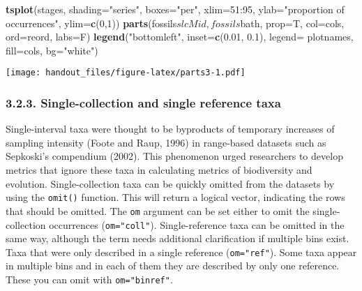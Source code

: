 \documentclass[]{article}
\newenvironment{Shaded}{\begin{snugshade}}{\end{snugshade}}
\newcommand{\KeywordTok}[1]{\textcolor[rgb]{0.13,0.29,0.53}{\textbf{{#1}}}}
\newcommand{\DataTypeTok}[1]{\textcolor[rgb]{0.13,0.29,0.53}{{#1}}}
\newcommand{\DecValTok}[1]{\textcolor[rgb]{0.00,0.00,0.81}{{#1}}}
\newcommand{\FloatTok}[1]{\textcolor[rgb]{0.00,0.00,0.81}{{#1}}}
\newcommand{\StringTok}[1]{\textcolor[rgb]{0.31,0.60,0.02}{{#1}}}
\newcommand{\NormalTok}[1]{{#1}}
\begin{document}
\begin{Shaded}
\begin{Highlighting}[]
\KeywordTok{tsplot}\NormalTok{(stages, }\DataTypeTok{shading=}\StringTok{"series"}\NormalTok{, }\DataTypeTok{boxes=}\StringTok{"per"}\NormalTok{, }\DataTypeTok{xlim=}\DecValTok{51}\NormalTok{:}\DecValTok{95}\NormalTok{,}
    \DataTypeTok{ylab=}\StringTok{"proportion of occurrences"}\NormalTok{, }\DataTypeTok{ylim=}\KeywordTok{c}\NormalTok{(}\DecValTok{0}\NormalTok{,}\DecValTok{1}\NormalTok{))}
\KeywordTok{parts}\NormalTok{(fossils$slcMid, fossils$bath, }\DataTypeTok{prop=}\NormalTok{T, }\DataTypeTok{col=}\NormalTok{cols, }\DataTypeTok{ord=}\NormalTok{reord, }\DataTypeTok{labs=}\NormalTok{F)}
\KeywordTok{legend}\NormalTok{(}\StringTok{"bottomleft"}\NormalTok{, }\DataTypeTok{inset=}\KeywordTok{c}\NormalTok{(}\FloatTok{0.01}\NormalTok{, }\FloatTok{0.1}\NormalTok{), }
  \DataTypeTok{legend=} \NormalTok{plotnames, }\DataTypeTok{fill=}\NormalTok{cols, }\DataTypeTok{bg=}\StringTok{"white"}\NormalTok{)}
\end{Highlighting}
\end{Shaded}

\texttt{[image: handout\_files/figure-latex/parts3-1.pdf]}

\subsubsection{3.2.3. Single-collection and single reference
taxa}\label{single-collection-and-single-reference-taxa}

Single-interval taxa were thought to be byproducts of temporary
increases of sampling intensity (Foote and Raup, 1996) in range-based
datasets such as Sepkoski's compendium (2002). This phenomenon urged
researchers to develop metrics that ignore these taxa in calculating
metrics of biodiversity and evolution. Single-collection taxa can be
quickly omitted from the datasets by using the \texttt{omit()} function.
This will return a logical vector, indicating the rows that should be
omitted. The \texttt{om} argument can be set either to omit the
single-collection occurrences (\texttt{om="coll"}). Single-reference
taxa can be omitted in the same way, although the term needs additional
clarification if multiple bins exist. Taxa that were only described in a
single reference (\texttt{om="ref"}). Some taxa appear in multiple bins
and in each of them they are described by only one reference. These you
can omit with \texttt{om="binref"}.
\end{document}
